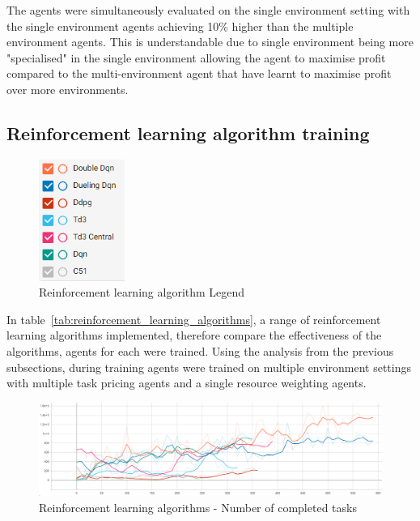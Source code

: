 The agents were simultaneously evaluated on the single environment setting with the single environment agents
achieving 10\% higher than the multiple environment agents. This is understandable due to single environment being
more "specialised" in the single environment allowing the agent to maximise profit compared to the multi-environment
agent that have learnt to maximise profit over more environments.

\subsection{Reinforcement learning algorithm training}
\label{subsec:reinforcement-learning-algorithm-training}

\begin{figure}
    \includegraphics[width=0.25\textwidth]{figures/5_evaluation_figs/algo_training_fig/legend.png}
    \caption{Reinforcement learning algorithm Legend}
    \label{fig:algo-training-legend}
\end{figure}

In table~\ref{tab:reinforcement_learning_algorithms}, a range of reinforcement learning algorithms implemented,
therefore compare the effectiveness of the algorithms, agents for each were trained. Using the analysis from the
previous subsections, during training agents were trained on multiple environment settings with multiple task pricing
agents and a single resource weighting agents.

\begin{figure}[H]
    \centering
    \includegraphics[width=\linewidth]{figures/5_evaluation_figs/algo_training_fig/num_completed_tasks.PNG}
    \caption{Reinforcement learning algorithms - Number of completed tasks}
    \label{fig:algo_num_completed_tasks}
\end{figure}

